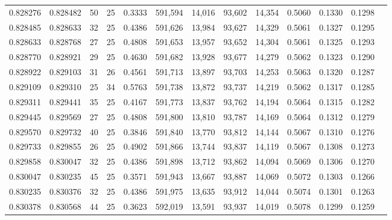 \begin{tabular}{rrrrrrrrrrrrr}
0.828276 & 0.828482 &    50 &  25 &                                     0.3333 & 591,594 &  14,016 &  93,602 &  14,354 & 0.5060 & 0.1330 & 0.1298 \\
0.828485 & 0.828633 &    32 &  25 &                                     0.4386 & 591,626 &  13,984 &  93,627 &  14,329 & 0.5061 & 0.1327 & 0.1295 \\
0.828633 & 0.828768 &    27 &  25 &                                     0.4808 & 591,653 &  13,957 &  93,652 &  14,304 & 0.5061 & 0.1325 & 0.1293 \\
0.828770 & 0.828921 &    29 &  25 &                                     0.4630 & 591,682 &  13,928 &  93,677 &  14,279 & 0.5062 & 0.1323 & 0.1290 \\
0.828922 & 0.829103 &    31 &  26 &                                     0.4561 & 591,713 &  13,897 &  93,703 &  14,253 & 0.5063 & 0.1320 & 0.1287 \\
0.829109 & 0.829310 &    25 &  34 &                                     0.5763 & 591,738 &  13,872 &  93,737 &  14,219 & 0.5062 & 0.1317 & 0.1285 \\
0.829311 & 0.829441 &    35 &  25 &                                     0.4167 & 591,773 &  13,837 &  93,762 &  14,194 & 0.5064 & 0.1315 & 0.1282 \\
0.829445 & 0.829569 &    27 &  25 &                                     0.4808 & 591,800 &  13,810 &  93,787 &  14,169 & 0.5064 & 0.1312 & 0.1279 \\
0.829570 & 0.829732 &    40 &  25 &                                     0.3846 & 591,840 &  13,770 &  93,812 &  14,144 & 0.5067 & 0.1310 & 0.1276 \\
0.829733 & 0.829855 &    26 &  25 &                                     0.4902 & 591,866 &  13,744 &  93,837 &  14,119 & 0.5067 & 0.1308 & 0.1273 \\
0.829858 & 0.830047 &    32 &  25 &                                     0.4386 & 591,898 &  13,712 &  93,862 &  14,094 & 0.5069 & 0.1306 & 0.1270 \\
0.830047 & 0.830235 &    45 &  25 &                                     0.3571 & 591,943 &  13,667 &  93,887 &  14,069 & 0.5072 & 0.1303 & 0.1266 \\
0.830235 & 0.830376 &    32 &  25 &                                     0.4386 & 591,975 &  13,635 &  93,912 &  14,044 & 0.5074 & 0.1301 & 0.1263 \\
0.830378 & 0.830568 &    44 &  25 &                                     0.3623 & 592,019 &  13,591 &  93,937 &  14,019 & 0.5078 & 0.1299 & 0.1259 \\

\end{tabular}
